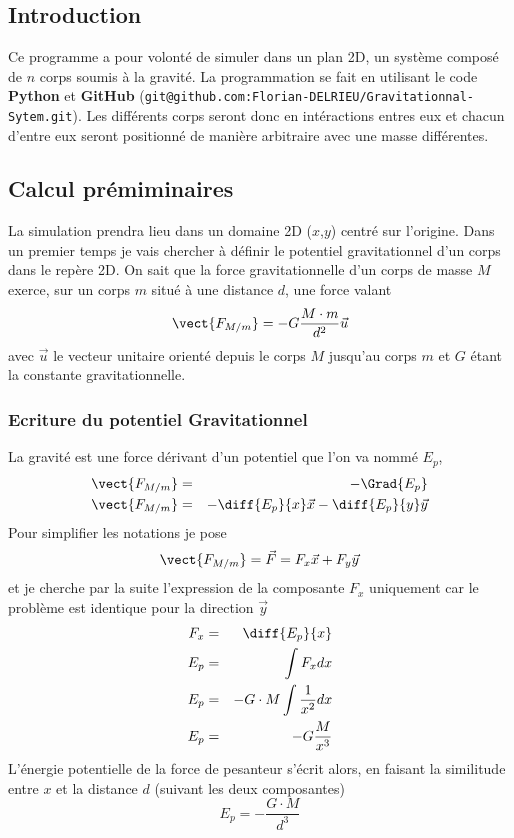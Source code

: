 \chapter{}
\section*{Introduction}
Ce programme a pour volonté de simuler dans un plan 2D, un système composé de $n$ corps soumis à la gravité. La programmation se fait en utilisant le code \textbf{Python} et \textbf{GitHub} (\verb!git@github.com:Florian-DELRIEU/Gravitationnal-Sytem.git!). Les différents corps seront donc en intéractions entres eux et chacun d'entre eux seront positionné de manière arbitraire avec une masse différentes.

\section*{Calcul prémiminaires}
La simulation prendra lieu dans un domaine 2D ($x$,$y$) centré sur l'origine. Dans un premier temps je vais chercher à définir le potentiel gravitationnel d'un corps dans le repère 2D. On sait que la force gravitationnelle d'un corps de masse $M$ exerce, sur un corps $m$ situé à une distance $d$, une force valant
\begin{equation}
    \vect{F_{M/m}} = - G \dfrac{M \cdot m}{d^2} \vec{u}
\end{equation}
avec $\vec{u}$ le vecteur unitaire orienté depuis le corps $M$ jusqu'au corps $m$ et $G$ étant la constante gravitationnelle.
\subsection{Ecriture du potentiel Gravitationnel}
La gravité est une force dérivant d'un potentiel que l'on va nommé $E_p$,
\begin{eqnarray}
    \vect{F_{M/m}} &=& - \Grad{E_p} \\
    \vect{F_{M/m}} &=& - \diff{E_p}{x} \vec{x} - \diff{E_p}{y} \vec{y}
\end{eqnarray}
Pour simplifier les notations je pose 
$$\vect{F_{M/m}} = \vec{F} = F_x\vec{x} + F_y\vec{y}$$
et je cherche par la suite l'expression de la composante $F_x$ uniquement car le problème est identique pour la direction $\vec{y}$
\begin{eqnarray}
    F_x &= &\diff{E_p}{x} \\
    E_p &= &\int{F_x} dx \\
    E_p &= & - G \cdot M \int{\dfrac{1}{x^2}} dx \\
    E_p &= & - G \dfrac{M}{x^3}
\end{eqnarray}
L'énergie potentielle de la force de pesanteur s'écrit alors, en faisant la similitude entre $x$ et la distance $d$ (suivant les deux composantes)
\begin{equation}
    \boxed{
    E_p =  - \dfrac{G \cdot M}{d^3}
    }
\end{equation}
